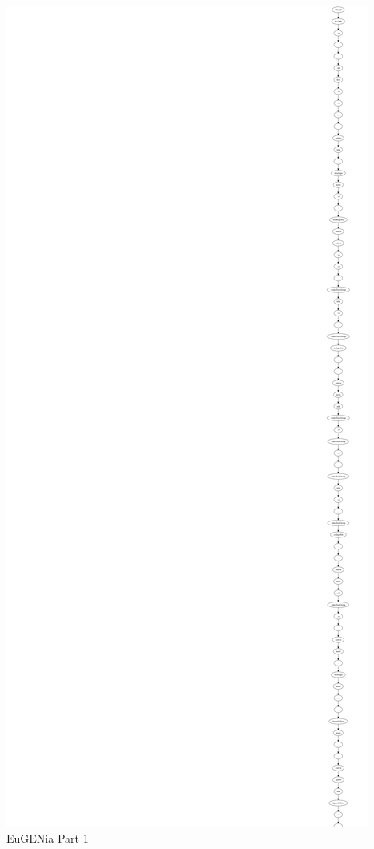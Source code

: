 \begin{minipage}[b]{\textwidth}
\centering
\includegraphics[height=0.97\textheight]{./figures/eug_1.png}
EuGENia Part 1
\end{minipage}
